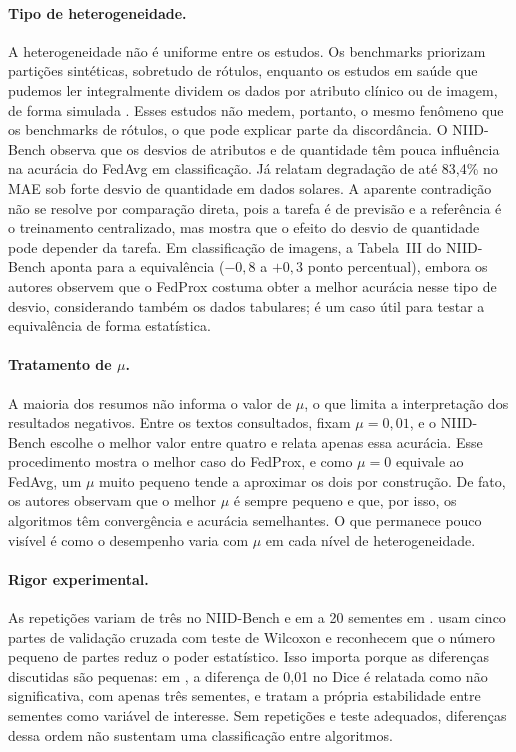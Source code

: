 \paragraph{Tipo de heterogeneidade.}
A heterogeneidade não é uniforme entre os estudos. Os benchmarks priorizam partições sintéticas, sobretudo de rótulos, enquanto os estudos em saúde que pudemos ler integralmente dividem os dados por atributo clínico ou de imagem, de forma simulada \citep{quintana2026mammography, marella2025fedonco}. Esses estudos não medem, portanto, o mesmo fenômeno que os benchmarks de rótulos, o que pode explicar parte da discordância. O NIID-Bench observa que os desvios de atributos e de quantidade têm pouca influência na acurácia do FedAvg em classificação. Já \citet{ghosh2026renewable} relatam degradação de até 83,4\% no MAE sob forte desvio de quantidade em dados solares. A aparente contradição não se resolve por comparação direta, pois a tarefa é de previsão e a referência é o treinamento centralizado, mas mostra que o efeito do desvio de quantidade pode depender da tarefa. Em classificação de imagens, a Tabela~III do NIID-Bench aponta para a equivalência ($-0{,}8$ a $+0{,}3$ ponto percentual), embora os autores observem que o FedProx costuma obter a melhor acurácia nesse tipo de desvio, considerando também os dados tabulares; é um caso útil para testar a equivalência de forma estatística.

\paragraph{Tratamento de $\mu$.}
A maioria dos resumos não informa o valor de $\mu$, o que limita a interpretação dos resultados negativos. Entre os textos consultados, \citet{marella2025fedonco} fixam $\mu = 0{,}01$, e o NIID-Bench escolhe o melhor valor entre quatro e relata apenas essa acurácia. Esse procedimento mostra o melhor caso do FedProx, e como $\mu = 0$ equivale ao FedAvg, um $\mu$ muito pequeno tende a aproximar os dois por construção. De fato, os autores observam que o melhor $\mu$ é sempre pequeno e que, por isso, os algoritmos têm convergência e acurácia semelhantes. O que permanece pouco visível é como o desempenho varia com $\mu$ em cada nível de heterogeneidade.

\paragraph{Rigor experimental.}
As repetições variam de três no NIID-Bench e em \citet{marella2025fedonco} a 20 sementes em \citet{enang2026optimiser}. \citet{quintana2026mammography} usam cinco partes de validação cruzada com teste de Wilcoxon e reconhecem que o número pequeno de partes reduz o poder estatístico. Isso importa porque as diferenças discutidas são pequenas: em \citet{marella2025fedonco}, a diferença de 0,01 no Dice é relatada como não significativa, com apenas três sementes, e \citet{enang2026optimiser} tratam a própria estabilidade entre sementes como variável de interesse. Sem repetições e teste adequados, diferenças dessa ordem não sustentam uma classificação entre algoritmos.

